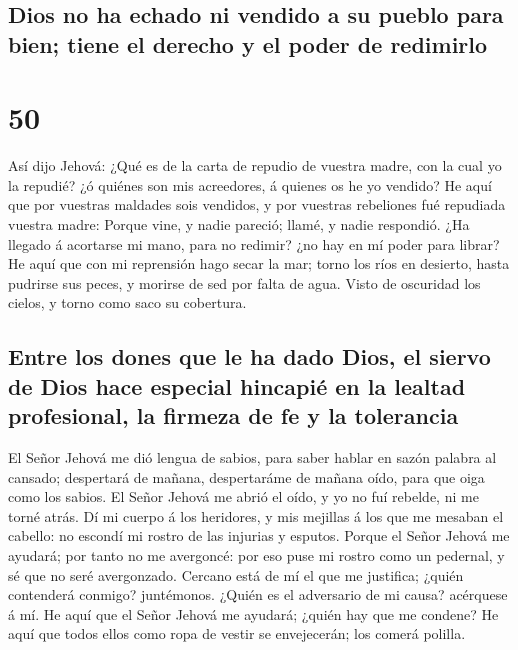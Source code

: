 \hypertarget{dios-no-ha-echado-ni-vendido-a-su-pueblo-para-bien-tiene-el-derecho-y-el-poder-de-redimirlo}{%
\subsection{Dios no ha echado ni vendido a su pueblo para bien; tiene el
derecho y el poder de
redimirlo}\label{dios-no-ha-echado-ni-vendido-a-su-pueblo-para-bien-tiene-el-derecho-y-el-poder-de-redimirlo}}

\hypertarget{section-23-50}{%
\section{50}\label{section-23-50}}

 Así dijo Jehová: ¿Qué es de la carta de repudio de
vuestra madre, con la cual yo la repudié? ¿ó quiénes son mis acreedores,
á quienes os he yo vendido? He aquí que por vuestras maldades sois
vendidos, y por vuestras rebeliones fué repudiada vuestra madre:
 Porque vine, y nadie pareció; llamé, y nadie respondió.
¿Ha llegado á acortarse mi mano, para no redimir? ¿no hay en mí poder
para librar? He aquí que con mi reprensión hago secar la mar; torno los
ríos en desierto, hasta pudrirse sus peces, y morirse de sed por falta
de agua.  Visto de oscuridad los cielos, y torno como saco
su cobertura.

\hypertarget{entre-los-dones-que-le-ha-dado-dios-el-siervo-de-dios-hace-especial-hincapiuxe9-en-la-lealtad-profesional-la-firmeza-de-fe-y-la-tolerancia}{%
\subsection{Entre los dones que le ha dado Dios, el siervo de Dios hace
especial hincapié en la lealtad profesional, la firmeza de fe y la
tolerancia}\label{entre-los-dones-que-le-ha-dado-dios-el-siervo-de-dios-hace-especial-hincapiuxe9-en-la-lealtad-profesional-la-firmeza-de-fe-y-la-tolerancia}}

 El Señor Jehová me dió lengua de sabios, para saber
hablar en sazón palabra al cansado; despertará de mañana, despertaráme
de mañana oído, para que oiga como los sabios.  El Señor
Jehová me abrió el oído, y yo no fuí rebelde, ni me torné atrás.
 Dí mi cuerpo á los heridores, y mis mejillas á los que me
mesaban el cabello: no escondí mi rostro de las injurias y esputos.
 Porque el Señor Jehová me ayudará; por tanto no me
avergoncé: por eso puse mi rostro como un pedernal, y sé que no seré
avergonzado.  Cercano está de mí el que me justifica;
¿quién contenderá conmigo? juntémonos. ¿Quién es el adversario de mi
causa? acérquese á mí.  He aquí que el Señor Jehová me
ayudará; ¿quién hay que me condene? He aquí que todos ellos como ropa de
vestir se envejecerán; los comerá polilla.

